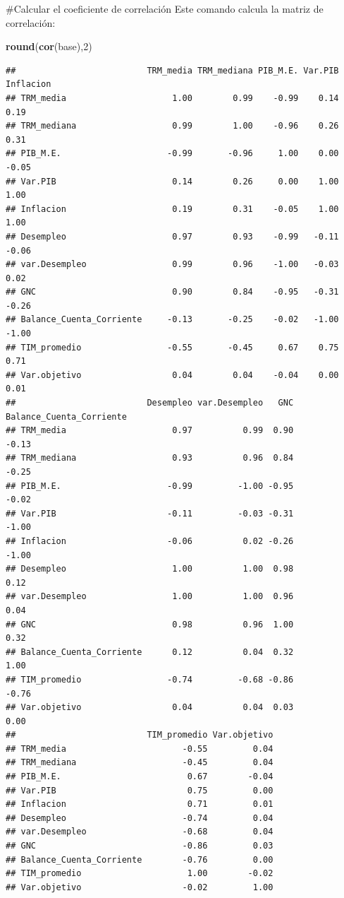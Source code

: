 \documentclass[
  11pt,
]{book}
\newenvironment{Shaded}{\begin{snugshade}}{\end{snugshade}}
\newcommand{\DecValTok}[1]{\textcolor[rgb]{0.00,0.00,0.81}{#1}}
\newcommand{\KeywordTok}[1]{\textcolor[rgb]{0.13,0.29,0.53}{\textbf{#1}}}
\newcommand{\NormalTok}[1]{#1}
\begin{document}
\#Calcular el coeficiente de correlación Este comando calcula la matriz
de correlación:

\begin{Shaded}
\begin{Highlighting}[]
\KeywordTok{round}\NormalTok{(}\KeywordTok{cor}\NormalTok{(base),}\DecValTok{2}\NormalTok{)  }
\end{Highlighting}
\end{Shaded}

\begin{verbatim}
##                          TRM_media TRM_mediana PIB_M.E. Var.PIB Inflacion
## TRM_media                     1.00        0.99    -0.99    0.14      0.19
## TRM_mediana                   0.99        1.00    -0.96    0.26      0.31
## PIB_M.E.                     -0.99       -0.96     1.00    0.00     -0.05
## Var.PIB                       0.14        0.26     0.00    1.00      1.00
## Inflacion                     0.19        0.31    -0.05    1.00      1.00
## Desempleo                     0.97        0.93    -0.99   -0.11     -0.06
## var.Desempleo                 0.99        0.96    -1.00   -0.03      0.02
## GNC                           0.90        0.84    -0.95   -0.31     -0.26
## Balance_Cuenta_Corriente     -0.13       -0.25    -0.02   -1.00     -1.00
## TIM_promedio                 -0.55       -0.45     0.67    0.75      0.71
## Var.objetivo                  0.04        0.04    -0.04    0.00      0.01
##                          Desempleo var.Desempleo   GNC Balance_Cuenta_Corriente
## TRM_media                     0.97          0.99  0.90                    -0.13
## TRM_mediana                   0.93          0.96  0.84                    -0.25
## PIB_M.E.                     -0.99         -1.00 -0.95                    -0.02
## Var.PIB                      -0.11         -0.03 -0.31                    -1.00
## Inflacion                    -0.06          0.02 -0.26                    -1.00
## Desempleo                     1.00          1.00  0.98                     0.12
## var.Desempleo                 1.00          1.00  0.96                     0.04
## GNC                           0.98          0.96  1.00                     0.32
## Balance_Cuenta_Corriente      0.12          0.04  0.32                     1.00
## TIM_promedio                 -0.74         -0.68 -0.86                    -0.76
## Var.objetivo                  0.04          0.04  0.03                     0.00
##                          TIM_promedio Var.objetivo
## TRM_media                       -0.55         0.04
## TRM_mediana                     -0.45         0.04
## PIB_M.E.                         0.67        -0.04
## Var.PIB                          0.75         0.00
## Inflacion                        0.71         0.01
## Desempleo                       -0.74         0.04
## var.Desempleo                   -0.68         0.04
## GNC                             -0.86         0.03
## Balance_Cuenta_Corriente        -0.76         0.00
## TIM_promedio                     1.00        -0.02
## Var.objetivo                    -0.02         1.00
\end{verbatim}
\end{document}
